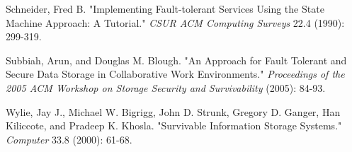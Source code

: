 \documentclass[letterpaper,twocolumn,10pt]{article}
\begin{document}
\begin{thebibliography}{9}
Schneider, Fred B. "Implementing Fault-tolerant Services Using the State Machine Approach: A Tutorial." \emph{CSUR ACM Computing Surveys} 22.4 (1990): 299-319.

Subbiah, Arun, and Douglas M. Blough. "An Approach for Fault Tolerant and Secure Data Storage in Collaborative Work Environments." \emph{Proceedings of the 2005 ACM Workshop on Storage Security and Survivability} (2005): 84-93.

Wylie, Jay J., Michael W. Bigrigg, John D. Strunk, Gregory D. Ganger, Han Kiliccote, and Pradeep K. Khosla. "Survivable Information Storage Systems." \emph{Computer} 33.8 (2000): 61-68.

\end{thebibliography}
\end{document}
